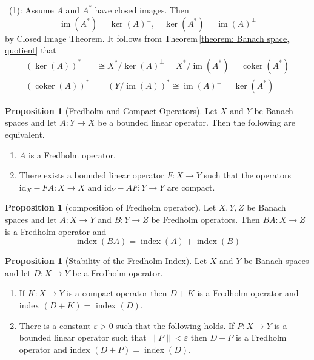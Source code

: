 \documentclass[12pt,a4paper]{book}
\newenvironment{prooff}{{\noindent\it\textcolor{cyan!40!black}{Proof}:}\,}{\par}
\newenvironment{enu}{\begin{enumerate}[(1)]}{\end{enumerate}}
\theoremstyle{definition}
\newtheorem{prop}[defn]{Proposition}
\begin{document}
\begin{prooff}
    (1): Assume $A$ and $A^*$ have closed images. Then
$$
\operatorname{im}\left(A^*\right)=\operatorname{ker}(A)^{\perp}, \quad \operatorname{ker}\left(A^*\right)=\operatorname{im}(A)^{\perp}
$$
by Closed Image Theorem. It follows from Theorem\,\ref{theorem: Banach space, quotient} that
$$
\begin{aligned}
(\operatorname{ker}(A))^* & \cong X^* / \operatorname{ker}(A)^{\perp}=X^* / \operatorname{im}\left(A^*\right)=\operatorname{coker}\left(A^*\right) \\
(\operatorname{coker}(A))^* & =(Y / \operatorname{im}(A))^* \cong \operatorname{im}(A)^{\perp}=\operatorname{ker}\left(A^*\right)
\end{aligned}
$$
\end{prooff}
\begin{prop}[Fredholm and Compact Operators]
    Let $X$ and $Y$ be Banach spaces and let $A: Y \rightarrow X$ be a bounded linear operator. Then the following are equivalent.
\begin{enu} 
    \item $A$ is a Fredholm operator.
    \item There exists a bounded linear operator $F: X \rightarrow Y$ such that the operators $\text{id}_X-F A: X \rightarrow X$ and $\text{id}_Y-A F: Y \rightarrow Y$ are compact.
\end{enu}
\end{prop}
\begin{prop}[composition of Fredholm operator]
    Let $X, Y, Z$
    be Banach spaces and let $A: X \rightarrow Y$ and $B: Y \rightarrow Z$ be Fredholm operators.
    Then $B A: X \rightarrow Z$ is a Fredholm operator and
    $$
    \operatorname{index}(B A)=\operatorname{index}(A)+\operatorname{index}(B)
    $$
\end{prop}
\begin{prop}[Stability of the Fredholm Index]
    Let $X$ and $Y$ be Banach spaces and let $D: X \rightarrow Y$ be a Fredholm operator.
\begin{enu} 
    \item If $K: X \rightarrow Y$ is a compact operator then $D+K$ is a Fredholm operator and index $(D+K)=$ index $(D)$.
    \item There is a constant $\varepsilon>0$ such that the following holds. If $P: X \rightarrow Y$ is a bounded linear operator such that $\|P\|<\varepsilon$ then $D+P$ is a Fredholm operator and index $(D+P)=\operatorname{index}(D)$.
\end{enu}
\end{prop}
\end{document}

